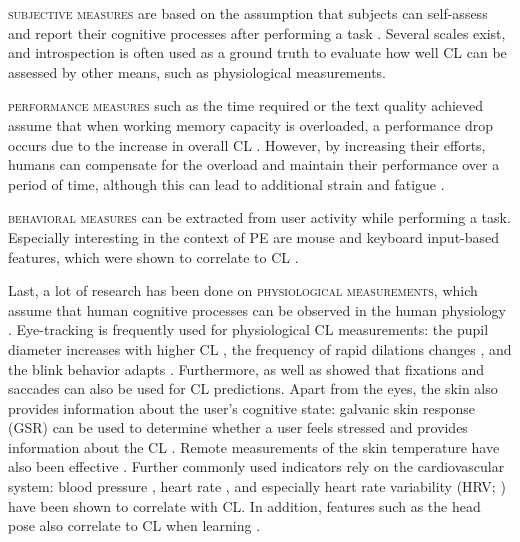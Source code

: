 \documentclass[output=paper]{langsci/langscibook}
\begin{document}
\textsc{subjective measures} are based on the assumption that subjects can self-as\-sess and report their cognitive processes after performing a task \citep{paas1994instructional}. Several scales exist, and introspection is often used as a ground truth to evaluate how well CL can be assessed by other means, such as physiological measurements.

\textsc{performance measures} such as the time required or the text quality achieved assume that when working memory capacity is overloaded, a performance drop occurs due to the increase in overall CL \citep{chen2016robust}. However, by increasing their efforts, humans can compensate for the overload and maintain their performance over a period of time, although this can lead to additional strain and fatigue \citep{hockey1997compensatory}.

\textsc{behavioral measures} can be extracted from user activity while performing a task. Especially interesting in the context of PE are mouse and keyboard input-based features, which were shown to correlate to CL \citep{arshad2013analysing}.

Last, a lot of research has been done on \textsc{physiological measurements}, which assume that human cognitive processes can be observed in the human physiology \citep{kramer1991physiological}.
Eye-tracking is frequently used for physiological CL measurements: the pupil diameter increases with higher CL \citep{iqbal2004task,obrien_eye-tracking_2006}, the frequency of rapid dilations changes \citep{demberg2016frequency}, and the blink behavior adapts \citep{van2001eye}. Furthermore, \citet{chen2013automatic} as well as \citet{stuyven2000effect} showed that fixations and saccades can also be used for CL predictions.
Apart from the eyes, the skin also provides information about the user's cognitive state: galvanic skin response (GSR) can be used to determine whether a user feels stressed \citep{villarejo2012stress} and provides information about the CL \citep{shi2007galvanic}. Remote measurements of the skin temperature have also been effective \citep{yamakoshi2008feasibility}.
Further commonly used indicators rely on the cardiovascular system: blood pressure \citep{yamakoshi2008feasibility}, heart rate \citep{mulder1992measurement}, and especially heart rate variability (HRV; \citealp{rowe1998heart}) have been shown to correlate with CL.
In addition, features such as the head pose also correlate to CL when learning \citep{asteriadis2009estimation}.
\end{document}
